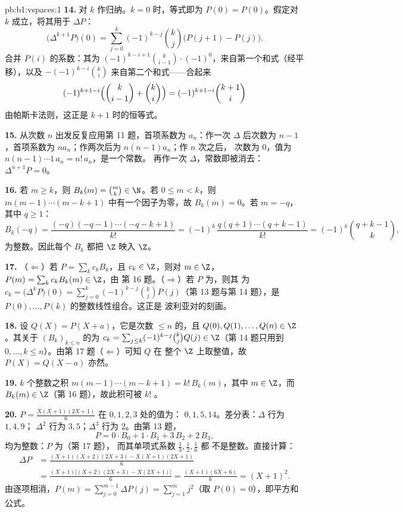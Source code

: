 \begin{solution}{pb:b1:vspaces:1}
\textbf{14.} 对 $k$ 作归纳。$k = 0$ 时，等式即为
$P(0) = P(0)$。假定对 $k$ 成立，将其用于 $\Delta P$：
\[
\bigl(\Delta^{k+1} P\bigr)(0)
= \sum_{j=0}^{k} (-1)^{k-j}\binom kj \bigl(P(j+1) - P(j)\bigr).
\]
合并 $P(i)$ 的系数：其为 $(-1)^{k-i+1}\binom
k{i-1}\cdot(-1)^{0}$，来自第一个和式（经平移），以及
$-(-1)^{k-i}\binom ki$ 来自第二个和式——合起来
\[
(-1)^{k+1-i}\Bigl(\binom k{i-1} + \binom ki\Bigr)
= (-1)^{k+1-i}\binom{k+1}i
\]
由帕斯卡法则，这正是 $k + 1$ 时的恒等式。

\textbf{15.} 从次数 $n$ 出发反复应用第 11 题，首项系数为
$a_n$：作一次 $\Delta$ 后次数为 $n-1$，首项系数为
$n a_n$；作两次后为 $n(n-1)a_n$；作 $n$ 次之后，
次数为 $0$，值为 $n(n-1)\cdots 1\, a_n = n!\,a_n$，是一个常数。
再作一次 $\Delta$，常数即被消去：$\Delta^{n+1}P = 0$。

\textbf{16.} 若 $m \geq k$，则 $B_k(m) = \binom mk \in \N$。若 $0
\leq m < k$，则 $m(m-1)\cdots(m-k+1)$ 中有一个因子为零，故
$B_k(m) = 0$。若 $m = -q$，其中 $q \geq 1$：
\[
B_k(-q) = \frac{(-q)(-q-1)\cdots(-q-k+1)}{k!}
= (-1)^k\,\frac{q(q+1)\cdots(q+k-1)}{k!}
= (-1)^k \binom{q+k-1}{k},
\]
为整数。因此每个 $B_k$ 都把 $\Z$ 映入 $\Z$。

\textbf{17.} （$\Leftarrow$）若 $P = \sum_k c_k B_k$，且 $c_k \in
\Z$，则对 $m \in \Z$，$P(m) = \sum_k c_k B_k(m) \in \Z$，由
第 16 题。（$\Rightarrow$）若 $P$ 为，则其
为 $c_k = \bigl(\Delta^k P\bigr)(0) = \sum_{j=0}^k
(-1)^{k-j}\binom kj P(j)$（第 13 题与第 14 题），是
$P(0), \dots, P(k)$ 的整数线性组合。这正是
波利亚对的刻画。

\textbf{18.} 设 $Q(X) = P(X + a)$，它是次数 $\leq
n$ 的，且 $Q(0), Q(1), \dots, Q(n) \in \Z$。其关于
$(B_k)_{k \leq n}$ 的为 $c_k = \sum_{j \leq k}(-1)^{k-j}\binom kj
Q(j) \in \Z$（第 14 题只用到 $0, \dots, k
\leq n$）。由第 17 题（$\Leftarrow$）可知 $Q$ 在
整个 $\Z$ 上取整值，故 $P(X) = Q(X - a)$ 亦然。

\textbf{19.} $k$ 个整数之积 $m(m-1)
\cdots(m-k+1) = k!\,B_k(m)$，其中 $m \in \Z$，而 $B_k(m) \in
\Z$（第 16 题），故此积可被 $k!$ 。

\textbf{20.} $P = \frac{X(X+1)(2X+1)}{6}$ 在 $0,1,2,3$ 处的值为：
$0, 1, 5, 14$。差分表：$\Delta$ 行为 $1, 4, 9$；
$\Delta^2$ 行为 $3, 5$；$\Delta^3$ 行为 $2$。由第 13 题，
\[
P = 0\cdot B_0 + 1\cdot B_1 + 3\,B_2 + 2\,B_3 ,
\]
均为整数：$P$ 为（第 17 题），
而其单项式系数 $\frac13, \frac12, \frac16$ 都
不是整数。直接计算：
\begin{align*}
\Delta P &= \frac{(X+1)(X+2)(2X+3) - X(X+1)(2X+1)}{6} \\
&= \frac{(X+1)\bigl[(X+2)(2X+3) - X(2X+1)\bigr]}{6}
= \frac{(X+1)(6X+6)}{6} = (X+1)^2 .
\end{align*}
由逐项相消，$P(m) = \sum_{j=0}^{m-1}\Delta P(j) = \sum_{j=1}^{m}
j^2$（取 $P(0) = 0$），即平方和公式。


\end{solution}
